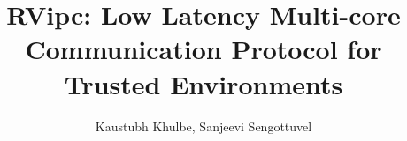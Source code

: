 \documentclass[sigplan,screen,10pt]{acmart}
\begin{document}
\title{RVipc: Low Latency Multi-core Communication Protocol for Trusted Environments}

\author{Kaustubh Khulbe, Sanjeevi Sengottuvel}



\maketitle








\end{document}
